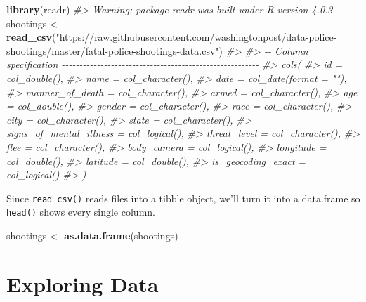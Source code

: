\documentclass[
  12pt,
]{book}
\newenvironment{Shaded}{\begin{snugshade}}{\end{snugshade}}
\newcommand{\CommentTok}[1]{\textcolor[rgb]{0.37,0.37,0.37}{\textit{#1}}}
\newcommand{\KeywordTok}[1]{\textcolor[rgb]{0.27,0.27,0.27}{\textbf{#1}}}
\newcommand{\NormalTok}[1]{#1}
\newcommand{\StringTok}[1]{\textcolor[rgb]{0.5,0.5,0.5}{#1}}
\begin{document}
\begin{Shaded}
\begin{Highlighting}[]
\KeywordTok{library}\NormalTok{(readr)}
\CommentTok{\#\textgreater{} Warning: package \textquotesingle{}readr\textquotesingle{} was built under R version 4.0.3}
\NormalTok{shootings \textless{}{-}}\StringTok{ }\KeywordTok{read\_csv}\NormalTok{(}\StringTok{"https://raw.githubusercontent.com/washingtonpost/data{-}police{-}shootings/master/fatal{-}police{-}shootings{-}data.csv"}\NormalTok{)}
\CommentTok{\#\textgreater{} }
\CommentTok{\#\textgreater{} {-}{-} Column specification {-}{-}{-}{-}{-}{-}{-}{-}{-}{-}{-}{-}{-}{-}{-}{-}{-}{-}{-}{-}{-}{-}{-}{-}{-}{-}{-}{-}{-}{-}{-}{-}{-}{-}{-}{-}{-}{-}{-}{-}{-}{-}{-}{-}{-}{-}{-}{-}{-}{-}{-}{-}{-}{-}{-}{-}}
\CommentTok{\#\textgreater{} cols(}
\CommentTok{\#\textgreater{}   id = col\_double(),}
\CommentTok{\#\textgreater{}   name = col\_character(),}
\CommentTok{\#\textgreater{}   date = col\_date(format = ""),}
\CommentTok{\#\textgreater{}   manner\_of\_death = col\_character(),}
\CommentTok{\#\textgreater{}   armed = col\_character(),}
\CommentTok{\#\textgreater{}   age = col\_double(),}
\CommentTok{\#\textgreater{}   gender = col\_character(),}
\CommentTok{\#\textgreater{}   race = col\_character(),}
\CommentTok{\#\textgreater{}   city = col\_character(),}
\CommentTok{\#\textgreater{}   state = col\_character(),}
\CommentTok{\#\textgreater{}   signs\_of\_mental\_illness = col\_logical(),}
\CommentTok{\#\textgreater{}   threat\_level = col\_character(),}
\CommentTok{\#\textgreater{}   flee = col\_character(),}
\CommentTok{\#\textgreater{}   body\_camera = col\_logical(),}
\CommentTok{\#\textgreater{}   longitude = col\_double(),}
\CommentTok{\#\textgreater{}   latitude = col\_double(),}
\CommentTok{\#\textgreater{}   is\_geocoding\_exact = col\_logical()}
\CommentTok{\#\textgreater{} )}
\end{Highlighting}
\end{Shaded}

Since \texttt{read\_csv()} reads files into a tibble object, we'll turn it into a data.frame so \texttt{head()} shows every single column.

\begin{Shaded}
\begin{Highlighting}[]
\NormalTok{shootings \textless{}{-}}\StringTok{ }\KeywordTok{as.data.frame}\NormalTok{(shootings)}
\end{Highlighting}
\end{Shaded}

\hypertarget{exploring-data}{%
\section{Exploring Data}\label{exploring-data}}
\end{document}
